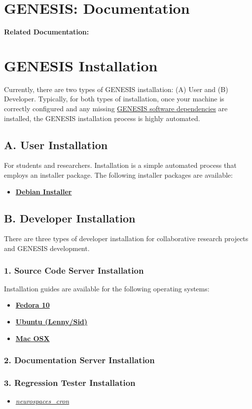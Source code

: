 \documentclass[12pt]{article}
\begin{document}
\section*{GENESIS: Documentation}

{\bf Related Documentation:}

\section*{GENESIS  Installation}

Currently, there are two types of GENESIS installation: (A) User and (B) Developer. Typically, for both types of installation, once your machine is correctly configured and any missing \href{../genesis-dependencies/genesis-dependencies.tex}{GENESIS software dependencies} are installed, the GENESIS installation process is highly automated.

\subsection*{A. User Installation}

For students and researchers. Installation is a simple automated process that employs an installer package. The following installer packages are available:
\begin{itemize}
   \item[] \href{../installation-debian/installation-debian.tex}{\bf Debian Installer}
\end{itemize}
   
\subsection*{B. Developer Installation}

There are three types of developer installation for collaborative research projects and GENESIS development.

\subsubsection*{1. Source Code Server Installation}

Installation guides are available for the following operating systems:
\begin{itemize}
   \item[]\href{../installation-fedora10/installation-fedora10.tex}{\bf Fedora 10}
   \item[]\href{../installation-ubuntu-lennysid/installation-ubuntu-lennysid.tex}{\bf Ubuntu (Lenny/Sid)}
   \item[]\href{../installation-osx/installation-osx.tex}{\bf Mac OSX}
\end{itemize}   

\subsubsection*{2. Documentation Server Installation}

\subsubsection*{3. Regression Tester Installation}

\begin{itemize}
   \item[]\href{../neurospaces-cron/neurospaces-cron.tex}{\it neurospaces\_cron}
\end{itemize}
\end{document}
